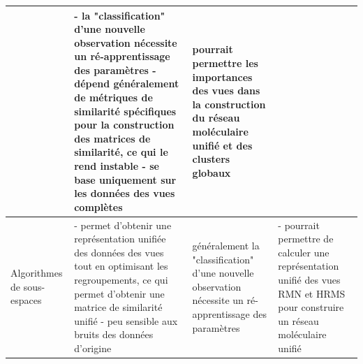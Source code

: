 \documentclass[12pt, french, latin.medieval, a4paper]{report}
\begin{document}
\begin{center}
\begin{longtable}{|p{2.5cm}|p{4.5cm}|p{4.5cm}|p{3cm}|}
                    	&
                    	{- la "classification" d'une nouvelle observation nécessite un ré-apprentissage des paramètres} \newline\newline
                    	{- dépend généralement de métriques de similarité spécifiques pour la construction des matrices de similarité, ce qui le rend instable } \newline\newline
                    	{- se base uniquement sur les données des vues complètes}
                    	&
                    	{  pourrait permettre les importances des vues dans la construction du réseau moléculaire unifié et des clusters globaux }
                    	\\
                    	\hline
                    	Algorithmes de sous-espaces
                    	&
                    	{- permet d'obtenir une représentation unifiée des données des vues tout en optimisant les regroupements, ce qui permet d'obtenir une matrice de similarité unifié } \newline\newline
                    	{- peu sensible aux bruits des données d'origine}
                    	&
                    	{  généralement la "classification" d'une nouvelle observation nécessite un ré-apprentissage des paramètres}
                    	&
                    	{- pourrait permettre de calculer une représentation unifié des vues RMN et HRMS pour construire un réseau moléculaire unifié}
                    	\\
                	\hline
            	\end{longtable}
        	\end{center}
\end{document}
